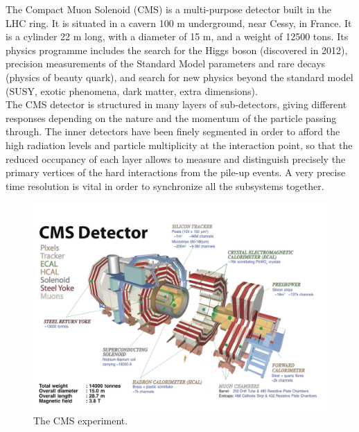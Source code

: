 The Compact Muon Solenoid (CMS) is a multi-purpose detector built in the LHC ring. It is situated in a cavern 100 m underground, near Cessy, in France. It is a cylinder 22 m long, with a diameter of 15 m, and a weight of 12500 tons. Its physics programme includes the search for the Higgs boson (discovered in 2012), precision measurements of the Standard Model parameters and rare decays (physics of beauty quark), and search for new physics beyond the standard model (SUSY, exotic phenomena, dark matter, extra dimensions).\\
The CMS detector is structured in many layers of sub-detectors, giving different responses depending on the nature and the momentum of the particle passing through. The inner detectors have been finely segmented in order to afford the high radiation levels and particle multiplicity at the interaction point, so that the reduced occupancy of each layer allows to measure and distinguish precisely the primary vertices of the hard interactions from the pile-up events. A very precise time resolution is vital in order to synchronize all the subsystems together.\\

\begin{figure}[!htb]
  \centering
    \includegraphics[width=.99\textwidth]{figures/cms_3d.png}
  \caption{The CMS experiment.}
  \label{fig:CMS_1}
\end{figure}

